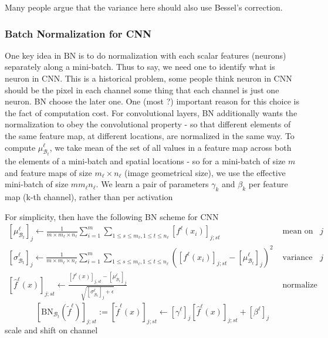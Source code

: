 \documentclass[10pt]{article}
\begin{document}
Many people argue that the variance here should also use Bessel's correction.

\subsubsection{Batch Normalization for CNN}
One key idea in $\mathrm{BN}$ is to do normalization with each scalar features (neurons) separately along a mini-batch. Thus to say, we need one to identify what is neuron in CNN. This is a historical problem, some people think neuron in CNN should be the pixel in each channel some thing that each channel is just one neuron. BN choose the later one. One (most ?) important reason for this choice is the fact of computation cost. For convolutional layers, BN additionally wants the normalization to obey the convolutional property - so that different elements of the same feature map, at different locations, are normalized in the same way. To compute $\mu_{\mathcal{B}_{t}}^{\ell}$, we take mean of the set of all values in a feature map across both the elements of a mini-batch and spatial locations - so for a mini-batch of size $m$ and feature maps of size $m_{\ell} \times n_{\ell}$ (image geometrical size), we use the effective mini-batch of size $m m_{\ell} n_{\ell}$. We learn a pair of parameters $\gamma_{k}$ and $\beta_{k}$ per feature map (k-th channel), rather than per activation

For simplicity, then have the following BN scheme for CNN
$$
\begin{array}{cc}
{\left[\mu_{\mathcal{B}_{t}}^{\ell}\right]_{j} \leftarrow \frac{1}{m \times m_{\ell} \times n_{\ell}} \sum_{i=1}^{m} \sum_{1 \leq s \leq m_{\ell}, 1 \leq t \leq n_{\ell}}\left[f^{\ell}\left(x_{i}\right)\right]_{j ; s t}} & \text { mean on channel } j \\
{\left[\sigma_{\mathcal{B}_{t}}^{\ell}\right]_{j} \leftarrow \frac{1}{m \times m_{\ell} \times n_{\ell}} \sum_{i=1}^{m} \sum_{1 \leq s \leq m_{\ell}, 1 \leq t \leq n_{\ell}}\left(\left[f^{\ell}\left(x_{i}\right)\right]_{j ; s t}-\left[\mu_{\mathcal{B}_{t}}^{\ell}\right]_{j}\right)^{2}} & \text { variance on channel } j \\
{\left[\hat{f}^{\ell}(x)\right]_{j ; s t} \leftarrow \frac{\left[f^{\ell}(x)\right]_{j, s t}-\left[\mu_{\mathcal{B}_{t}}^{\ell}\right]_{j}}{\sqrt{\left[\sigma_{\mathcal{B}_{t}}^{\ell}\right]_{j}+\epsilon}}} & \text { normalize }
\end{array}
$$
$$
\left[\mathrm{BN}_{\mathcal{B}_{t}}\left(\tilde{f}^{\ell}\right)\right]_{j ; s t}:=\left[\tilde{f}^{\ell}(x)\right]_{j ; s t} \leftarrow\left[\gamma^{\ell}\right]_{j}\left[\hat{f}^{\ell}(x)\right]_{j ; s t}+\left[\beta^{\ell}\right]_{j}
$$
scale and shift on channel
\end{document}
